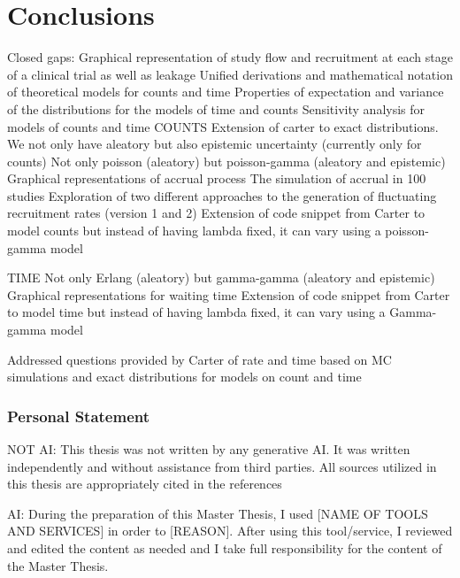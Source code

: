 

\chapter{Conclusions}

Closed gaps:
Graphical representation of study flow and recruitment at each stage of a clinical trial as well as leakage
Unified derivations and mathematical notation of theoretical models for counts and time
Properties of expectation and variance of the distributions for the models of time and counts
Sensitivity analysis for models of counts and time 
COUNTS
Extension of carter to exact distributions. 
We not only have aleatory but also epistemic uncertainty (currently only for counts)
Not only poisson (aleatory) but poisson-gamma (aleatory and epistemic)
Graphical representations of accrual process
The simulation of accrual in 100 studies 
Exploration of two different approaches to the generation of fluctuating recruitment rates (version 1 and 2)
Extension of code snippet from Carter to model counts but instead of having lambda fixed, it can vary using a poisson-gamma model

TIME
Not only Erlang (aleatory) but gamma-gamma (aleatory and epistemic)
Graphical representations for waiting time
Extension of code snippet from Carter to model time but instead of having lambda fixed, it can vary using a Gamma-gamma model 
 

Addressed questions provided by Carter of rate and time based on MC simulations and exact distributions for models on count and time

\subsection{Personal Statement}

NOT AI:
This thesis was not written by any generative AI. It was written independently and
without assistance from third parties. All sources utilized in this thesis are appropriately cited in the references

AI:
During the preparation of this Master Thesis, I used [NAME OF TOOLS AND SERVICES] in order to [REASON]. After using this tool/service, I reviewed and edited the content as needed and I take full responsibility for the content of the Master Thesis.



